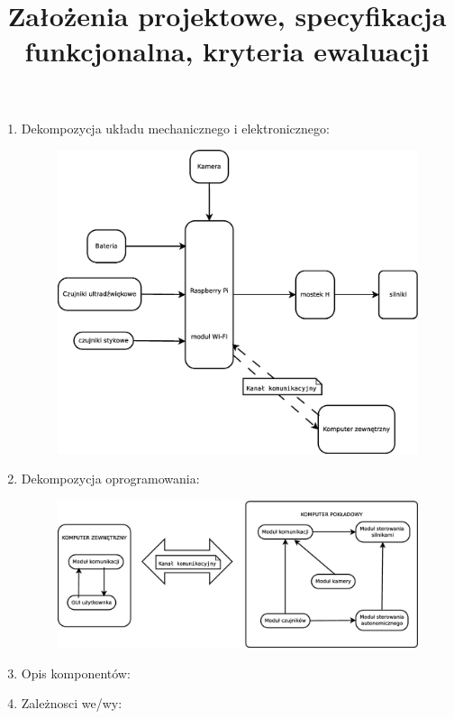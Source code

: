 \documentclass[a4paper]{article}
\title{Założenia projektowe, specyfikacja funkcjonalna, kryteria ewaluacji}
\date{}
\author{}
\begin{document}
\maketitle

\begin{enumerate}

\item Dekompozycja układu mechanicznego i elektronicznego:
\begin{figure}
\centering
\includegraphics[scale=.7]{./idea sprzet-mech}
\end{figure}

\item Dekompozycja oprogramowania:
\begin{figure}
\centering
\includegraphics[scale=.7]{./idea programowa}
\end{figure}

\item Opis komponentów:

\item Zależnosci we/wy:


\end{enumerate}
\end{document}
